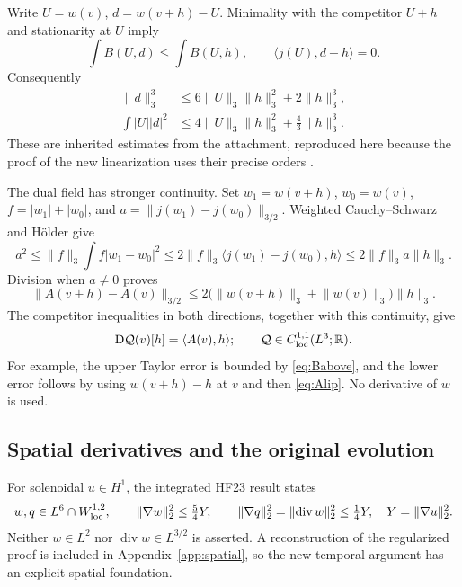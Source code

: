 \documentclass[11pt,a4paper]{article}
\theoremstyle{definition}\newtheorem{definition}[theorem]{Definition}
\theoremstyle{remark}\newtheorem{remark}[theorem]{Remark}
\newcommand{\R}{\mathbb R}
\newcommand{\Q}{\mathcal Q}
\newcommand{\norm}[1]{\lVert #1\rVert}
\newcommand{\ip}[2]{\langle #1,#2\rangle}
\newcommand{\diver}{\operatorname{div}}
\numberwithin{equation}{section}
\begin{document}
Write $U=w(v)$, $d=w(v+h)-U$. Minimality with the competitor $U+h$ and stationarity at $U$ imply
\[
 \int B(U,d)\le\int B(U,h),
 \qquad \ip{j(U)}{d-h}=0.
\]
Consequently
\begin{align}
 \norm d_3^3&\le6\norm U_3\norm h_3^2+2\norm h_3^3,\label{eq:holder}\\
 \int |U||d|^2&\le4\norm U_3\norm h_3^2+\tfrac43\norm h_3^3.\label{eq:weightedbasic}
\end{align}
These are inherited estimates from the attachment, reproduced here because the proof of the new linearization uses their precise orders \cite{Attachment}.

The dual field has stronger continuity. Set $w_1=w(v+h)$, $w_0=w(v)$, $f=|w_1|+|w_0|$, and $a=\norm{j(w_1)-j(w_0)}_{3/2}$. Weighted Cauchy--Schwarz and H\"older give
\[
 a^2\le\norm f_3\int f|w_1-w_0|^2
 \le2\norm f_3\ip{j(w_1)-j(w_0)}h
 \le2\norm f_3a\norm h_3.
\]
Division when $a\ne0$ proves
\begin{equation}\label{eq:Alip}
 \norm{A(v+h)-A(v)}_{3/2}
 \le2\bigl(\norm{w(v+h)}_3+\norm{w(v)}_3\bigr)\norm h_3.
\end{equation}
The competitor inequalities in both directions, together with this continuity, give
\begin{equation}\label{eq:Qprime}
 \mathrm D\Q(v)[h]=\ip{A(v)}h;
 \qquad \Q\in C^{1,1}_{\rm loc}(L^3;\R).
\end{equation}
For example, the upper Taylor error is bounded by \eqref{eq:Babove}, and the lower error follows by using $w(v+h)-h$ at $v$ and then \eqref{eq:Alip}. No derivative of $w$ is used.

\subsection{Spatial derivatives and the original evolution}
For solenoidal $u\in H^1$, the integrated HF23 result states
\begin{equation}\label{eq:divcurl}
 w,q\in L^6\cap W^{1,2}_{\rm loc},\qquad
 \norm{\nabla w}_2^2\le\tfrac54Y,\qquad
 \norm{\nabla q}_2^2=\norm{\diver w}_2^2\le\tfrac14Y,
 \quad Y=\norm{\nabla u}_2^2.
\end{equation}
Neither $w\in L^2$ nor $\diver w\in L^{3/2}$ is asserted. A reconstruction of the regularized proof is included in Appendix~\ref{app:spatial}, so the new temporal argument has an explicit spatial foundation.
\end{document}
